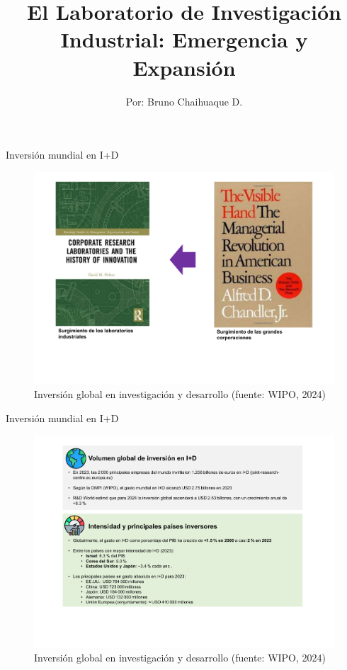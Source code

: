 \documentclass{beamer}
\title{El Laboratorio de Investigación Industrial: Emergencia y Expansión}
\author{Por: Bruno Chaihuaque D.}
\date{}
\begin{document}
	
	\begin{frame}
		\titlepage
	\end{frame}
		\begin{frame}{Inversión mundial en I+D}
			\begin{figure}
				\centering
				\includegraphics[width=1\linewidth]{./figs/L2.pdf}
				\caption{Inversión global en investigación y desarrollo (fuente: WIPO, 2024)}
			\end{figure}
		\end{frame}
	\begin{frame}{Inversión mundial en I+D}
		\begin{figure}
			\centering
			\includegraphics[width=1\linewidth]{./figs/L1.pdf}
			\caption{Inversión global en investigación y desarrollo (fuente: WIPO, 2024)}
		\end{figure}
	\end{frame}
\end{document}
